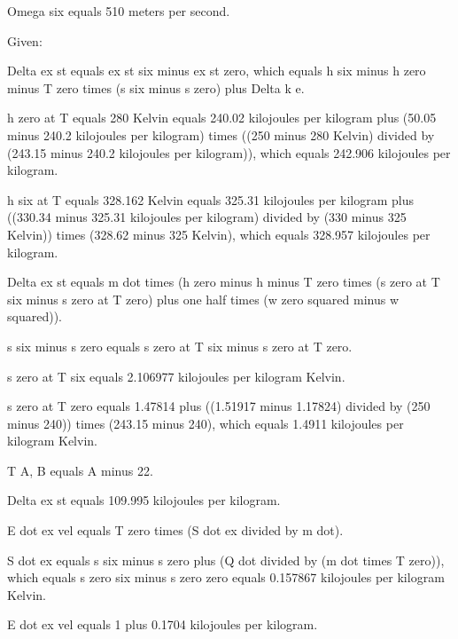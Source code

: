 Omega six equals 510 meters per second.

Given:

Delta ex st equals ex st six minus ex st zero, which equals h six minus h zero minus T zero times (s six minus s zero) plus Delta k e.

h zero at T equals 280 Kelvin equals 240.02 kilojoules per kilogram plus (50.05 minus 240.2 kilojoules per kilogram) times ((250 minus 280 Kelvin) divided by (243.15 minus 240.2 kilojoules per kilogram)), which equals 242.906 kilojoules per kilogram.

h six at T equals 328.162 Kelvin equals 325.31 kilojoules per kilogram plus ((330.34 minus 325.31 kilojoules per kilogram) divided by (330 minus 325 Kelvin)) times (328.62 minus 325 Kelvin), which equals 328.957 kilojoules per kilogram.

Delta ex st equals m dot times (h zero minus h minus T zero times (s zero at T six minus s zero at T zero) plus one half times (w zero squared minus w squared)).

s six minus s zero equals s zero at T six minus s zero at T zero.

s zero at T six equals 2.106977 kilojoules per kilogram Kelvin.

s zero at T zero equals 1.47814 plus ((1.51917 minus 1.17824) divided by (250 minus 240)) times (243.15 minus 240), which equals 1.4911 kilojoules per kilogram Kelvin.

T A, B equals A minus 22.

Delta ex st equals 109.995 kilojoules per kilogram.

E dot ex vel equals T zero times (S dot ex divided by m dot).

S dot ex equals s six minus s zero plus (Q dot divided by (m dot times T zero)), which equals s zero six minus s zero zero equals 0.157867 kilojoules per kilogram Kelvin.

E dot ex vel equals 1 plus 0.1704 kilojoules per kilogram.